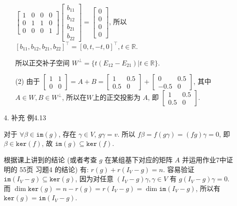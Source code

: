 \documentclass{article}
\begin{document}
\begin{itemize}
\begin{itemize}
        $\left[\begin{array}{cccc}1&0&0&0\\0&1&1&0\\0&0&0&1\end{array}\right]\left[\begin{array}{c}b_{11}\\b_{12}\\b_{21}\\b_{22}\end{array}\right] = \left[\begin{array}{c}0\\0\\0\\0\end{array}\right]$, 所以 $[b_{11}, b_{12}, b_{21}, b_{22}]^\top = [0, t, -t, 0]^\top, t\in\mathbb{R}$.

        所以正交补子空间 $W^\perp = \{t(E_{12} - E_{21}) | t\in\mathbb{R}\}$.

        \item [(2)] 由于 $\left[\begin{array}{cc}1&1\\0&0\end{array}\right] = A + B = \left[\begin{array}{cc}1&0.5\\0.5&0\end{array}\right] + \left[\begin{array}{cc}0&0.5\\-0.5&0\end{array}\right]$, 其中 $A\in W, B\in W^\perp$, 所以在$W$上的正交投影为 $A$, 即 $\left[\begin{array}{cc}1&0.5\\0.5&0\end{array}\right]$.
        
    \end{itemize}

    \item [4.] 补充 例4.13
    
    对于 $\forall \beta\in \mathtt{im}(g)$, 存在 $\gamma\in V$, $g\gamma = v$. 所以 $f\beta = f(g\gamma) = (fg) \gamma = 0$, 即 $\beta \in \mathtt{ker}(f)$,
    故 $\mathtt{im}(g)\subseteq \mathtt{ker}(f)$.

    根据课上讲到的结论 (或者考查 $g$ 在某组基下对应的矩阵 $A$ 并运用作业7中证明的 55页 习题4 的结论) 有:
    $r(g) + r(I_V - g) = n$. 容易验证 $\mathtt{im}(I_V - g) \subseteq \mathtt{ker}(g)$, 因为对任意 $(I_V - g)\gamma, \gamma\in V$ 有 $g(I_V-g)\gamma = 0$. 而 $\dim\mathtt{ker}(g) = n-r(g) = r(I_V-g)=\dim\mathtt{im}(I_V-g)$, 所以有 $\mathtt{ker}(g) = \mathtt{im}(I_V - g)$. 
    

\end{itemize}
\end{document}
